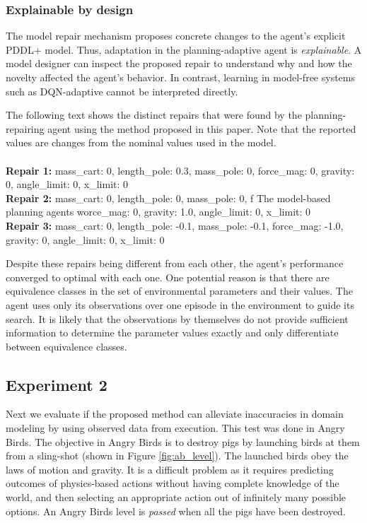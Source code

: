 \documentclass[letterpaper]{article} %
\newenvironment{console}{\ttfamily}{\par}
\begin{document}
\subsubsection{Explainable by design}
The model repair mechanism proposes concrete changes to the agent's explicit PDDL+ model. Thus, adaptation in the planning-adaptive agent is \emph{explainable}. A model designer can inspect the proposed repair to understand why and how the novelty affected the agent's behavior. In contrast, learning in model-free systems such as DQN-adaptive cannot be interpreted directly.

The following text shows the distinct repairs that were found by the planning-repairing agent using the method proposed in this paper. Note that the reported values are changes from the nominal values used in the model. \\
\\
\begin{console}
\small
     \textbf{Repair 1:} {mass\_cart: 0, length\_pole: 0.3, mass\_pole: 0, force\_mag: 0, gravity: 0, angle\_limit: 0, x\_limit: 0} \\
    \textbf{Repair 2:} {mass\_cart: 0, length\_pole: 0, mass\_pole: 0, f
The model-based planning agents worce\_mag: 0, gravity: 1.0, angle\_limit: 0, x\_limit: 0}
    \\
    \textbf{Repair 3:} {mass\_cart: 0, length\_pole: -0.1, mass\_pole: -0.1, force\_mag: -1.0, gravity: 0, angle\_limit: 0, x\_limit: 0}
\end{console}
\smallskip
Despite these repairs being different from each other, the agent's performance converged to optimal with each one. One potential reason is that there are equivalence classes in the set of environmental parameters and their values. The agent uses only its observations over one episode in the environment to guide its search. It is likely that the observations by themselves do not provide sufficient information to determine the parameter values exactly and only differentiate between equivalence classes.

\subsection{Experiment 2}
Next we evaluate if the proposed method can alleviate inaccuracies in domain modeling by using observed data from execution. This test was done in Angry Birds. The objective in Angry Birds is to destroy pigs by launching birds at them from a sling-shot (shown in Figure \ref{fig:ab_level}). The launched birds obey the laws of motion and gravity. It is a difficult problem as it requires predicting outcomes of physics-based actions without having complete knowledge of the world, and then selecting an appropriate action out of infinitely many possible options. An Angry Birds level is \emph{passed} when all the pigs have been destroyed.
\end{document}
